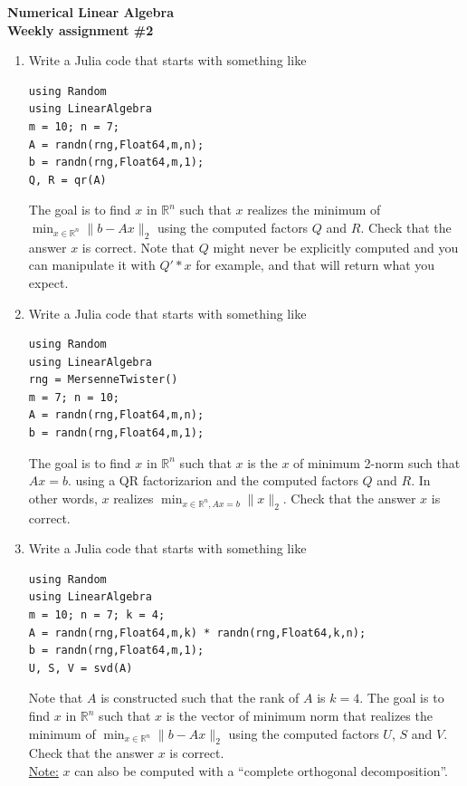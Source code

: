 \documentclass[11pt,letterpaper]{article}
\begin{document}
\begin{center}
{\Large \bf Numerical Linear Algebra }\\
{\Large \bf Weekly assignment \#2 }
\end{center}

\small

\begin{enumerate}

\item
Write a Julia code that starts with something like
\begin{verbatim}
using Random
using LinearAlgebra
m = 10; n = 7;
A = randn(rng,Float64,m,n);
b = randn(rng,Float64,m,1);
Q, R = qr(A)
\end{verbatim}
The goal is to find $x$ in $\mathbb{R}^n$ such that $x$ realizes the minimum of 
$\min_{x\in\mathbb{R}^n} \| b - Ax \|_2$ using the computed 
factors $Q$ and $R$. Check that the answer $x$ is correct.
Note that $Q$ might never be explicitly computed and you can manipulate it
with $Q'*x$ for example, and that will return what you expect.

\item
Write a Julia code that starts with something like
\begin{verbatim}
using Random
using LinearAlgebra
rng = MersenneTwister()
m = 7; n = 10;
A = randn(rng,Float64,m,n);
b = randn(rng,Float64,m,1);
\end{verbatim}
The goal is to find $x$ in $\mathbb{R}^n$
such that $x$ is the $x$ of minimum 2-norm such that $Ax=b$.
using a QR factorizarion and the computed 
factors $Q$ and $R$. 
In other words, $x$ realizes
$\min_{x\in\mathbb{R}^n, Ax=b} \| x \|_2$.
Check that the answer $x$ is correct.

\item
Write a Julia code that starts with something like
\begin{verbatim}
using Random
using LinearAlgebra
m = 10; n = 7; k = 4;
A = randn(rng,Float64,m,k) * randn(rng,Float64,k,n);
b = randn(rng,Float64,m,1);
U, S, V = svd(A)
\end{verbatim}
Note that $A$ is constructed such that the rank of $A$ is $k=4$.
The goal is to find $x$ in $\mathbb{R}^n$ such that $x$ 
is the vector of minimum norm that 
realizes the minimum of 
$\min_{x\in\mathbb{R}^n} \| b - Ax \|_2$
using the computed 
factors $U$, $S$ and $V$.
Check that the answer $x$ is correct.\\
\underline{Note:} $x$ can also be computed with a 
``complete orthogonal decomposition''. 


\end{enumerate}
\end{document}
